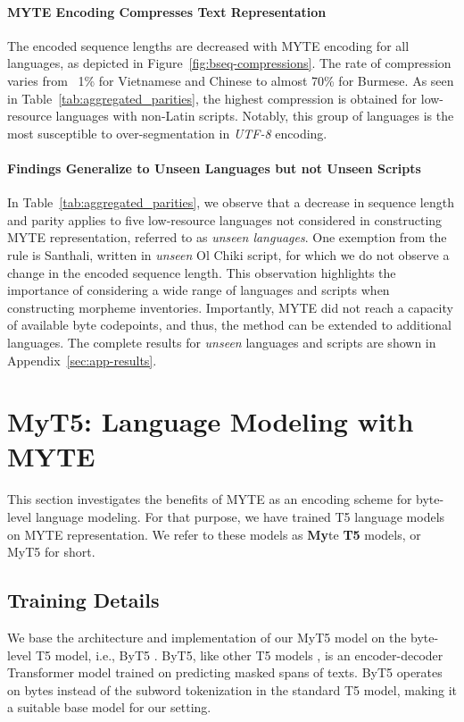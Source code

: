 \paragraph{\textsc{MYTE} Encoding Compresses Text Representation} The encoded sequence lengths are decreased with \textsc{MYTE} encoding for all languages, as depicted in Figure~\ref{fig:bseq-compressions}.
The rate of compression varies from ~1\% for Vietnamese and Chinese to almost 70\% for Burmese. As seen in Table~\ref{tab:aggregated_parities}, the highest compression is obtained for low-resource languages with non-Latin scripts. Notably, this group of languages is the most susceptible to over-segmentation in \emph{UTF-8} encoding.

\paragraph{Findings Generalize to Unseen Languages but not Unseen Scripts} In Table~\ref{tab:aggregated_parities}, we observe that a decrease in sequence length and parity applies to five low-resource languages not considered in constructing \textsc{MYTE} representation, referred to as \emph{unseen languages}. One exemption from the rule is Santhali, written in \emph{unseen} Ol Chiki script, for which we do not observe a change in the encoded sequence length. This observation highlights the importance of considering a wide range of languages and scripts when constructing morpheme inventories. Importantly, \textsc{MYTE} did not reach a capacity of available byte codepoints, and thus, the method can be extended to additional languages. The complete results for \emph{unseen} languages and scripts are shown in Appendix~\ref{sec:app-results}.

\section{MyT5: Language Modeling with \textsc{MYTE}}

This section investigates the benefits of \textsc{MYTE} as an encoding scheme for byte-level language modeling. For that purpose, we have trained T5 language models on \textsc{MYTE} representation. We refer to these models as \textbf{My}te \textbf{T5} models, or MyT5 for short.

\subsection{Training Details}

We base the architecture and implementation of our MyT5 model on the byte-level T5 model, i.e., ByT5 \cite{xue_byt5_2022}. ByT5, like other T5 models \cite{raffel_exploring_2019}, is an encoder-decoder Transformer model trained on predicting masked spans of texts. ByT5 operates on bytes instead of the subword tokenization in the standard T5 model, making it a suitable base model for our setting.

